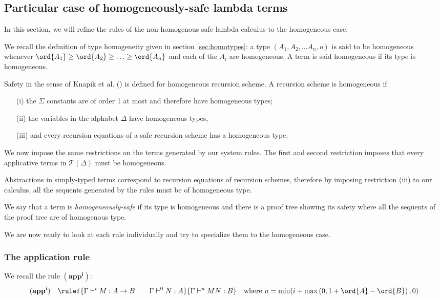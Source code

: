 \subsection{Particular case of homogeneously-safe lambda terms}

In this section, we will refine the rules of the non-homogenous safe lambda calculus to the homogeneous case.

We recall the definition of type homogeneity given in section \ref{sec:homotypes}:
a type $(A_1, A_2, \ldots A_n, o)$ is said to be homogeneous whenever $\ord{A_1} \geq \ord{A_2} \geq
\ldots \geq  \ord{A_n}$ and each of the $A_i$ are homogeneous. A term is said homogeneous if its type is homogeneous.

Safety in the sense of Knapik et al. (\cite{KNU02}) is defined for homogeneous recursion scheme.
A recursion scheme is homogeneous if
\begin{itemize}
    \item[(i)] the $\Sigma$ constants are of order 1 at most and therefore have homogeneous types;
    \item[(ii)] the variables in the alphabet $\Delta$ have homogeneous types,
    \item[(iii)] and every recursion equations of a safe recursion scheme has a homogeneous type.
\end{itemize}

We now impose the same restrictions on the terms generated by our system rules.
The first and second restriction imposes that every applicative terms in $\mathcal{T}(\Delta)$ must be homogeneous.

Abstractions in simply-typed terms correspond to recursion equations of recursion schemes,
therefore by imposing restriction (iii) to our calculus, all the sequents generated by the rules must be of homogeneous type.

We say that a term is \emph{homogeneously-safe} if its type is homogeneous
and there is a proof tree showing its safety where all the sequents
of the proof tree are of homogenous type.
\vspace{0.5cm}

We are now ready to look at each rule individually and try to specialize them to the homogeneous case.

\subsubsection{The application rule}
We recall the rule $\mathbf{(app^i)}$:
$$
 \mathbf{(app^i)} \quad  \rulef{\Gamma \vdash^i M : A\rightarrow B
                                        \qquad \Gamma \vdash^{0} N : A}
                                   {\Gamma  \vdash^{u} M N : B}
\quad \mbox{where } u = \min(i+\max\left(0, 1 + \ord{A} -
\ord{B}\right),0)
$$

